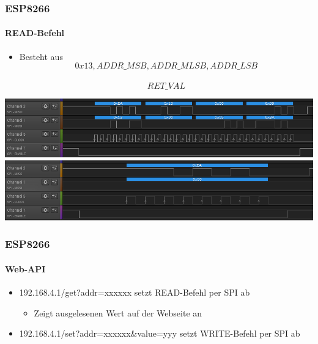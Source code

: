 \documentclass{beamer}
\begin{document}
\begin{frame}

	\frametitle{ESP8266}
	\framesubtitle{READ-Befehl}
	\begin{itemize}
		\item Besteht aus \[0x13, ADDR\_MSB, ADDR\_MLSB, ADDR\_LSB\]\\ \[RET\_VAL\]
	\end{itemize}
	\begin{center}
		\includegraphics[scale=0.4]{images/SPI_Read_CMD_capture_01.png}
		\includegraphics[scale=0.4]{images/SPI_Read_CMD_capture_02.png}
	\end{center}
	
\end{frame}

\begin{frame}

	\frametitle{ESP8266}
	\framesubtitle{Web-API}
	\begin{itemize}
		\item 192.168.4.1/get?addr=xxxxxx setzt READ-Befehl per SPI ab
		\begin{itemize}
			\item Zeigt ausgelesenen Wert auf der Webseite an
		\end{itemize}
		\item 192.168.4.1/set?addr=xxxxxx\&value=yyy setzt WRITE-Befehl per SPI ab
	\end{itemize}
	
\end{frame}

\end{document}
